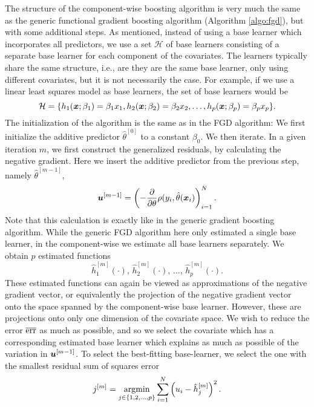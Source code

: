 The structure of the component-wise boosting algorithm is very much the same as the generic functional gradient boosting algorithm (Algorithm \ref{algo:fgd}), but with some additional steps.
As mentioned, instead of using a base learner which incorporates all predictors, we use a set $\mathcal{H}$ of base learners consisting of a separate base learner for each component of the covariates.
The learners typically share the same structure, i.e., are they are the same base learner, only using different covariates, but it is not necessarily the case.
For example, if we use a linear least squares model as base learners, the set of base learners would be
\begin{equation*}
    \mathcal{H}=\{h_1(\bm{x};\beta_1)=\beta_1 x_1,h_2(\bm{x};\beta_2)=\beta_2 x_2,\ldots,h_p(\bm{x};\beta_p)=\beta_p x_p \}.
\end{equation*}
The initialization of the algorithm is the same as in the FGD algorithm:
We first initialize the additive predictor $\hat{\theta}^{[0]}$ to a constant $\beta_0$.
We then iterate.
In a given iteration $m$, we first construct the generalized residuals, by calculating the negative gradient.
Here we insert the additive predictor from the previous step, namely $\hat{\theta}^{[m-1]}$,
\begin{equation*}
    \bm{u}^{[m-1]}=\left(-\frac{\partial}{\partial \theta}\rho(y_i, \hat{\theta}(\bm{x}_i)\right)_{i=1}^N.
\end{equation*}
Note that this calculation is exactly like in the generic gradient boosting algorithm.
While the generic FGD algorithm here only estimated a single base learner, in the component-wise we estimate all base learners separately.
We obtain $p$ estimated functions
\begin{equation*}
    \hat{h}_1^{[m]}(\cdot),\,\hat{h}_2^{[m]}(\cdot),\,\ldots,\,\hat{h}_p^{[m]}(\cdot).
\end{equation*}
These estimated functions can again be viewed as approximations of the negative gradient vector, or equivalently the projection of the negative gradient vector onto the space spanned by the component-wise base learner.
However, these are projections onto only one dimension of the covariate space.
We wish to reduce the error $\overline{\text{err}}$ as much as possible, and so we select the covariate which has a corresponding estimated base learner which explains as much as possible of the variation in $\bm{u}^{[m-1]}$.
To select the best-fitting base-learner, we select the one with the smallest residual sum of squares error
\begin{equation*}
    j^{[m]}=\operatorname*{argmin}_{j\in\{1,2,\ldots,p\}}\sum_{i=1}^N \left(u_i-\hat{h}_j^{[m]}\right)^2.
\end{equation*}

